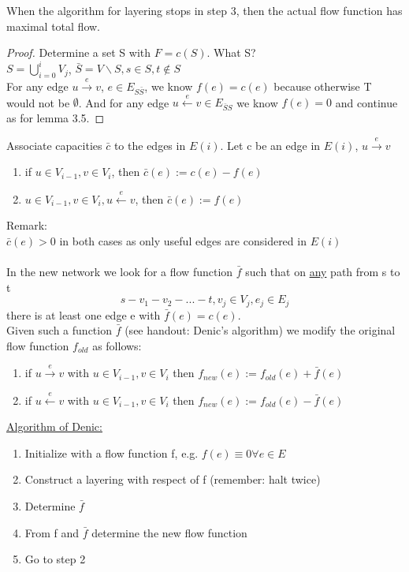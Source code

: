 \begin{theorem}
When the algorithm for layering stops in step 3, then the actual flow function has maximal total flow.
\end{theorem}

\begin{proof}
Determine a set S with $F = c(S)$. What S? \\
$ S = \bigcup_{i=0}^i V_j$, $\bar{S} = V \backslash S, s \in S, t \notin S$ \\ 
For any edge $ u \xrightarrow{e} v$, $e \in E_{S\bar{S}}$, we know $f(e) = c(e)$ because otherwise T would not be $\emptyset$. And for any edge $u \xleftarrow{e} v \in E_{\bar{S}S}$ we know $f(e) = 0$ and continue as for lemma 3.5.
\end{proof}

\begin{definition}
Associate capacities $\bar{c}$ to the edges in $E(i)$. Let c be an edge in $E(i)$, $ u \xrightarrow{e} v$ 
\begin{enumerate}
\item if $ u \in V_{i-1}, v \in V_i$, then $\bar{c}(e) := c(e) - f(e)$
\item $u \in V_{i-1}, v \in V_i, u \xleftarrow{e} v$, then $\bar{c}(e) := f(e)$
\end{enumerate}
Remark: \\
$\bar{c}(e) > 0 $ in both cases as only useful edges are considered in $E(i)$ \\ \\

In the new network we look for a flow function $\bar{f}$ such that on \underline{any} path from s to t 
\[s - v_1 - v_2 - ... - t, v_j \in V_j, e_j \in E_j\]
there is at least one edge e with $\bar{f}(e) = c(e)$. \\
Given such a function $\bar{f}$ (see handout: Denic's algorithm) we modify the original flow function $f_{old}$ as follows:
\begin{enumerate}
\item if $u \xrightarrow{e} v$ with $u \in V_{i-1}, v \in V_i$ then $f_{new}(e) := f_{old}(e) + \bar{f}(e)$
\item if $u \xleftarrow{e} v$ with $u \in V_{i-1}, v \in V_i$ then $f_{new}(e) := f_{old}(e) - \bar{f}(e) $
\end{enumerate}
\underline{Algorithm of Denic:} \\
\begin{enumerate}
\item Initialize with a flow function f, e.g. $f(e) \equiv 0 \forall e \in E$
\item Construct a layering with respect of f (remember: halt twice)
\item Determine $\bar{f}$
\item From f and $\bar{f}$ determine the new flow function
\item Go to step 2
\end{enumerate}
\end{definition}

